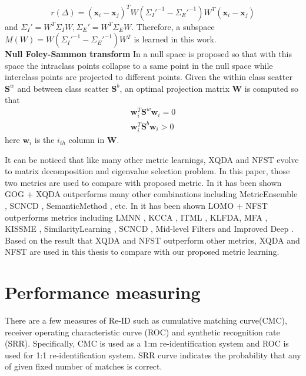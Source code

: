 \begin{equation}
r(\Delta) = (\bm{x}_i - \bm{x}_j)^TW({\Sigma_I}'^{-1} - {\Sigma_E}'^{-1})W^T(\bm{x}_i - \bm{x}_j)
\end{equation}
and ${\Sigma_I}' = W^T\Sigma_IW, {\Sigma_E}' = W^T\Sigma_EW$. Therefore, a subspace $M(W) = W({\Sigma_I}'^{-1} - {\Sigma_E}'^{-1})W^T$ is learned in this work.\\
\indent \textbf{Null Foley-Sammon transform} In \cite{NFST} a null space is proposed so that with this space the intraclass points collapse to a same point in the null space while interclass points are projected to different points. Given the within class scatter $\bm{S}^w$ and between class scatter $\bm{S}^b$, an optimal projection matrix $\bm{W}$ is computed so that 
\begin{equation}
\begin{aligned}
\bm{w}_i^T\bm{S}^w\bm{w}_i = 0\\
\bm{w}_i^T\bm{S}^b\bm{w}_i > 0
\end{aligned}
\end{equation}
here $\bm{w}_i$ is the $i_{th}$ column in $\bm{W}$.

It can be noticed that like many other metric learnings, XQDA and NFST evolve to matrix decomposition and eigenvalue selection problem. In this paper, those two metrics are used to compare with proposed metric. In \cite{GOG} it has been shown GOG + XQDA outperforms many other combinations including MetricEnsemble \cite{MetricEnsembles}, SCNCD \cite{SCNCD}, SemanticMethod \cite{SemanticMethod}, etc. In \cite{ NFST} it has been shown LOMO + NFST outperforms metrics including LMNN \cite{LMNN}, KCCA \cite{KCCA}, ITML \cite{ITML}, KLFDA\cite{KLFDA}, MFA \cite{KernelVersionMetrics}, KISSME \cite{KISSME}, SimilarityLearning \cite{SimilarityLearning}, SCNCD \cite{SCNCD}, Mid-level Filters \cite{MidlevelFilters} and Improved Deep \cite{ImprovedCNN}. Based on the result that XQDA and NFST outperform other metrics, XQDA and NFST are used in this thesis to compare with our proposed metric learning. 

\section{Performance measuring}
There are a few measures of Re-ID such as cumulative matching curve(CMC), receiver operating characteristic curve (ROC) and synthetic recognition rate (SRR). Specifically, CMC is used as a 1:m re-identification system and ROC is used for 1:1 re-identification system. SRR curve indicates the probability that any of given fixed number of matches is correct.

